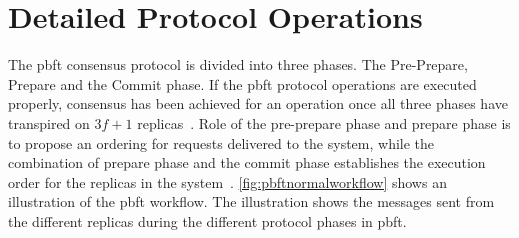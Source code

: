 

\section{Detailed Protocol Operations}
\label{sec:detailedProtocol}
The \ac{pbft} consensus protocol is divided into three phases. The Pre-Prepare, Prepare and the Commit phase. If the \ac{pbft} protocol operations are executed properly, consensus has been achieved for an operation once all three phases have transpired on $3f+1$ replicas~\cite[p.~257-259]{BOOK:BuildDepDistSyst}. Role of the pre-prepare phase and prepare phase is to propose an ordering for requests delivered to the system, while the combination of prepare phase and the commit phase establishes the execution order for the replicas in the system~\cite[p.~4]{PAPER:OGPBFT}. \autoref{fig:pbftnormalworkflow} shows an illustration of the \ac{pbft} workflow. The illustration shows the messages sent from the different replicas during the different protocol phases in \ac{pbft}.

